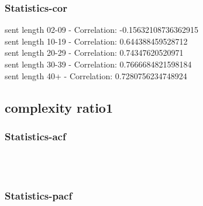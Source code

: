 \documentclass{article}%
\begin{document}
%
\newpage%
\subsubsection{Statistics{-}cor}%
\label{ssubsec:Statistics{-}cor}%
\noindent%
sent length 02-09 - Correlation: -0.15632108736362915\\%
sent length 10-19 - Correlation: 0.644388459528712\\%
sent length 20-29 - Correlation: 0.74347620520971\\%
sent length 30-39 - Correlation: 0.7666684821598184\\%
sent length 40+ - Correlation: 0.7280756234748924\\

%
\newpage

%
\subsection{complexity ratio1}%
\label{subsec:complexityratio1}%
\subsubsection{Statistics{-}acf}%
\label{ssubsec:Statistics{-}acf}%


\begin{figure}[ht]%
\centering%
\setlength{\abovecaptionskip}{-35pt}%
%
%
\\%
%
%
\\%
%
\end{figure}

%
\newpage%
\subsubsection{Statistics{-}pacf}%
\label{ssubsec:Statistics{-}pacf}%
\end{document}
